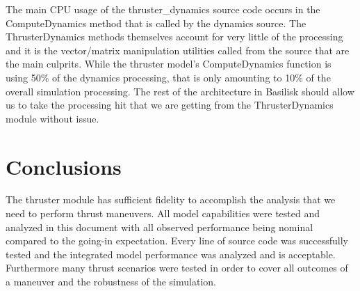 \documentclass[]{BasiliskReportMemo}
\begin{document}
The main CPU usage of the thruster\_dynamics source code occurs in the 
ComputeDynamics method that is called by the dynamics source.  The 
ThrusterDynamics methods themselves account for very little of the processing 
and it is the vector/matrix manipulation utilities called from the source that 
are the main culprits.  While the thruster model's ComputeDynamics function is 
using 50\% of the dynamics processing, that is only amounting to 10\% of the 
overall simulation processing.  The rest of the architecture in Basilisk should 
allow us to take the processing hit that we are getting from the 
ThrusterDynamics module without issue.

\section{Conclusions}
The thruster module has sufficient fidelity to accomplish the analysis 
that we need to perform thrust maneuvers.  All model capabilities were 
tested and analyzed in this document with all observed performance being nominal 
compared to the going-in expectation. Every line of source code was successfully tested and the integrated model 
performance was analyzed and is acceptable. Furthermore many thrust scenarios were tested in order to cover all outcomes of a maneuver and the robustness of the simulation.

\end{document}
